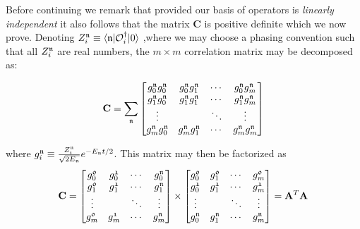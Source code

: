Before continuing we remark that provided our basis of operators is \emph{linearly independent} it also follows that the matrix $\mathbf{C}$ is positive definite which we now prove. Denoting $Z_i^{\mathfrak{n}} \equiv \langle \mathfrak{n} | \mathcal{O}_i^\dagger | 0 \rangle$ ,where we may choose a phasing convention such that all $Z_i^{\mathfrak{n}}$ are real numbers, the $m\times m$ correlation matrix may be decomposed as:

\begin{equation}
\mathbf{C} = \sum_{\mathfrak{n}} \begin{bmatrix} 
g_0^{\mathfrak{n}}g_0^{\mathfrak{n}}  & g_0^{\mathfrak{n}}g_1^{\mathfrak{n}} & \cdots & g_0^{\mathfrak{n}}g_m^{\mathfrak{n}} \\
g_1^{\mathfrak{n}}g_0^{\mathfrak{n}}  & g_1^{\mathfrak{n}}g_1^{\mathfrak{n}} & \cdots & g_1^{\mathfrak{n}}g_m^{\mathfrak{n}} \\
\vdots  					  & 						       & \ddots & \vdots  \\
g_m^{\mathfrak{n}}g_0^{\mathfrak{n}}  & g_m^{\mathfrak{n}}g_1^{\mathfrak{n}} & \cdots & g_m^{\mathfrak{n}}g_m^{\mathfrak{n}} \\
\end{bmatrix}
\end{equation}

where $g_i^{\mathfrak{n}} \equiv \frac{Z_i^{\mathfrak{n}}}{\sqrt{2E_{\mathfrak{n}}}}e^{-E_{\mathfrak{n}}t/2}$. This matrix may then be factorized as 
\begin{equation*}
\mathbf{C} =  \begin{bmatrix} 
g_0^{\mathfrak{0}} & g_0^{\mathfrak{1}} & \cdots &g_0^{\mathfrak{n}} \\
g_1^{\mathfrak{0}} & g_1^{\mathfrak{1}} & \cdots &g_1^{\mathfrak{n}} \\
\vdots &  & \ddots & \vdots \\
g_m^{\mathfrak{0}} & g_m^{\mathfrak{1}} & \cdots &g_m^{\mathfrak{n}} \\
\end{bmatrix} \times 
 \begin{bmatrix} 
g_0^{\mathfrak{0}} & g_1^{\mathfrak{0}} & \cdots &g_m^{\mathfrak{0}} \\
g_0^{\mathfrak{1}} & g_1^{\mathfrak{1}} & \cdots &g_m^{\mathfrak{1}} \\
\vdots &  & \ddots & \vdots \\
g_0^{\mathfrak{n}} & g_1^{\mathfrak{n}} & \cdots &g_m^{\mathfrak{n}} \\
\end{bmatrix} = \mathbf{A}^T\mathbf{A} \label{app::pos_def_decomp}
\end{equation*}

